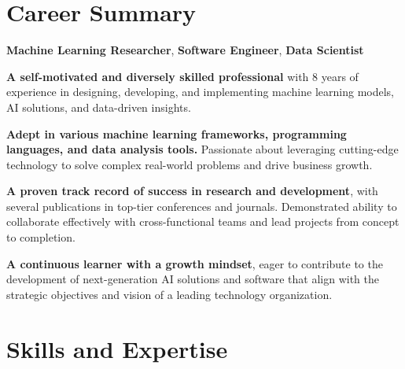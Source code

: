 \documentclass[11pt]{article}
\begin{document}
\maketitle

\section{Career Summary}

\begin{outerlist}
	\item \textbf{Machine Learning Researcher}, \textbf{Software Engineer}, \textbf{Data Scientist}
	\begin{innerlist}
		\item \textbf{A self-motivated and diversely skilled professional} with 8 years of experience in designing, developing, and implementing machine learning models, AI solutions, and data-driven insights.
    \item \textbf{Adept in various machine learning frameworks, programming languages, and data analysis tools.} Passionate about leveraging cutting-edge technology to solve complex real-world problems and drive business growth.
    \item \textbf{A proven track record of success in research and development}, with several publications in top-tier conferences and journals. Demonstrated ability to collaborate effectively with cross-functional teams and lead projects from concept to completion.
    \item \textbf{A continuous learner with a growth mindset}, eager to contribute to the development of next-generation AI solutions and software that align with the strategic objectives and vision of a leading technology organization.
	\end{innerlist}
\end{outerlist}


\section{Skills and Expertise}
\end{document}
